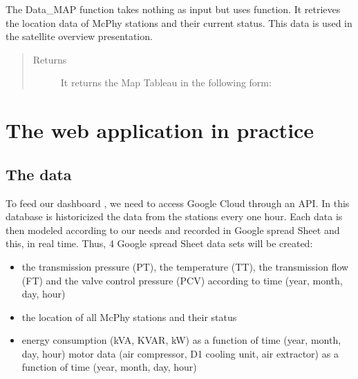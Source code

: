 \documentclass[letterpaper,10pt,english]{sphinxmanual}
\begin{document}
\begin{fulllineitems}
\label{\detokenize{read_write_google_API:Data_MAP}}
\sphinxAtStartPar
The Data\_MAP function takes nothing as input but uses  function.
It retrieves the location data of McPhy stations and their current status. This data is used in the satellite overview presentation.
\begin{quote}\begin{description}
\item[{Returns}] \leavevmode
\sphinxAtStartPar
It returns the Map Tableau in the following form:

\end{description}\end{quote}

\sphinxAtStartPar
{}

\end{fulllineitems}



\chapter{The web application in practice}
\label{\detokenize{The web application in practice:the-web-application-in-practice}}\label{\detokenize{The web application in practice::doc}}

\section{The data}
\label{\detokenize{The web application in practice:the-data}}
\sphinxAtStartPar
To feed our dashboard , we need to access Google Cloud through an API. In this database is historicized the data from the stations every one hour. Each data is then modeled according to our needs and recorded in Google spread Sheet and this, in real time. Thus, 4 Google spread Sheet data sets will be created:
\begin{itemize}
\item {} 
\sphinxAtStartPar
the transmission pressure (PT), the temperature (TT), the transmission flow (FT) and the valve control pressure (PCV) according to time (year, month, day, hour)

\item {} 
\sphinxAtStartPar
the location of all McPhy stations and their status

\item {} 
\sphinxAtStartPar
energy consumption (kVA, KVAR, kW) as a function of time (year, month, day, hour) \sphinxhyphen{} motor data (air compressor, D1 cooling unit, air extractor) as a function of time (year, month, day, hour)

\end{itemize}
\end{document}
